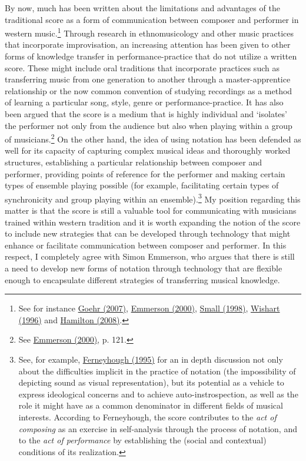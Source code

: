 By now, much has been written about the limitations and advantages of the traditional score as a form of communication between composer and performer in western music.\footnote{See for instance \hyperlink{goer}{Goehr (2007)}, \hyperlink{emmersoncross}{Emmerson (2000)}, \hyperlink{small}{Small (1998)}, \hyperlink{wishart}{Wishart (1996)} and \hyperlink{hamilton}{Hamilton (2008)}.} Through research in \mbox{ethnomusicology} and other music practices that incorporate improvisation, an increasing attention has been given to other forms of knowledge transfer in performance-practice that do not utilize a written score. These might include oral traditions that incorporate practices such as transferring music from one generation to another through a master-apprentice relationship or the now common convention of studying recordings as a method of learning a particular song, style, genre or performance-practice. It has also been argued that the score is a medium that is highly individual and `isolates' the performer not only from the audience but also when playing within a group of musicians.\footnote{See \hyperlink{emmersoncross}{Emmerson (2000)}, p. 121.} On the other hand, the idea of using notation has been defended as well for its capacity of capturing complex musical ideas and thoroughly worked structures, establishing a particular relationship between composer and performer, providing points of reference for the performer and making certain types of ensemble playing possible (for example, facilitating certain types of synchronicity and group playing within an ensemble).\footnote{See, for example, \hyperlink{ferneyhough}{Ferneyhough (1995)} for an in depth discussion not only about the difficulties implicit in the practice of notation (the impossibility of depicting sound as visual representation), but its potential as a vehicle to express ideological concerns and to achieve auto-instrospection,  as well as the role it might have as a common denominator in different fields of musical interests. According to Ferneyhough, the score contributes to the \emph{act of composing} as an exercise in self-analysis through the process of notation, and to the \emph{act of performance} by establishing the (social and contextual) conditions of its realization.} My position regarding this matter is that the score is still a valuable tool for communicating with musicians trained within western tradition and it is worth expanding the notion of the score to include new strategies that can be developed through technology that might enhance or facilitate communication between composer and performer. In this respect, I completely agree with Simon Emmerson, who argues that there is still a need to develop new forms of notation through technology that are flexible enough to encapsulate different strategies of transferring musical knowledge. 
